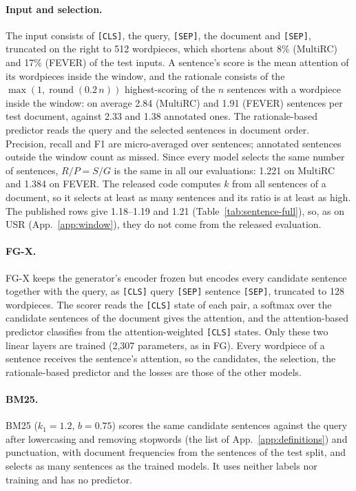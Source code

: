\documentclass[11pt]{article}
\begin{document}
\paragraph{Input and selection.} The input consists of \texttt{[CLS]}, the query, \texttt{[SEP]}, the document and \texttt{[SEP]}, truncated on the right to 512 wordpieces, which shortens about 8\% (MultiRC) and 17\% (FEVER) of the test inputs. A sentence's score is the mean attention of its wordpieces inside the window, and the rationale consists of the $\max(1, \operatorname{round}(0.2\,n))$ highest-scoring of the $n$ sentences with a wordpiece inside the window: on average 2.84 (MultiRC) and 1.91 (FEVER) sentences per test document, against 2.33 and 1.38 annotated ones. The rationale-based predictor reads the query and the selected sentences in document order. Precision, recall and F1 are micro-averaged over sentences; annotated sentences outside the window count as missed. Since every model selects the same number of sentences, $R/P = S/G$ is the same in all our evaluations: 1.221 on MultiRC and 1.384 on FEVER. The released code computes $k$ from all sentences of a document, so it selects at least as many sentences and its ratio is at least as high. The published rows give 1.18--1.19 and 1.21 (Table~\ref{tab:sentence-full}), so, as on USR (App.~\ref{app:window}), they do not come from the released evaluation.

\paragraph{FG-X.} FG-X keeps the generator's encoder frozen but encodes every candidate sentence together with the query, as \texttt{[CLS]} query \texttt{[SEP]} sentence \texttt{[SEP]}, truncated to 128 wordpieces. The scorer reads the \texttt{[CLS]} state of each pair, a softmax over the candidate sentences of the document gives the attention, and the attention-based predictor classifies from the attention-weighted \texttt{[CLS]} states. Only these two linear layers are trained (2,307 parameters, as in FG). Every wordpiece of a sentence receives the sentence's attention, so the candidates, the selection, the rationale-based predictor and the losses are those of the other models.

\paragraph{BM25.} BM25 ($k_1 = 1.2$, $b = 0.75$) scores the same candidate sentences against the query after lowercasing and removing stopwords (the list of App.~\ref{app:definitions}) and punctuation, with document frequencies from the sentences of the test split, and selects as many sentences as the trained models. It uses neither labels nor training and has no predictor.
\end{document}
